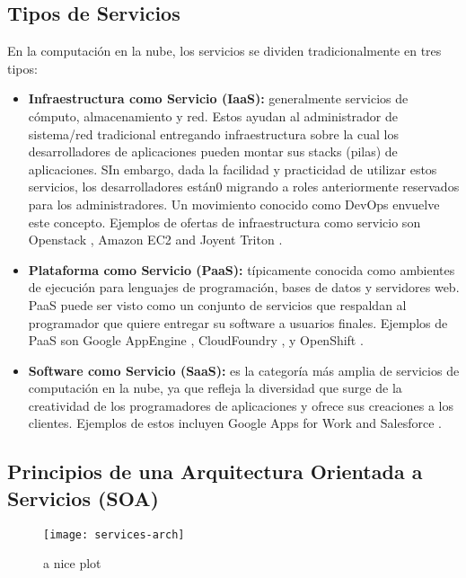         \subsection{Tipos de Servicios}
        En la computación en la nube, los servicios se dividen tradicionalmente en tres tipos:
        \begin{itemize}
            \item \textbf{Infraestructura como Servicio (IaaS):} generalmente servicios de cómputo, almacenamiento y red. Estos ayudan al administrador de sistema/red tradicional entregando infraestructura sobre la cual los desarrolladores de aplicaciones pueden montar sus stacks (pilas) de aplicaciones. SIn embargo, dada la facilidad y practicidad de utilizar estos servicios, los desarrolladores están0 migrando a roles anteriormente reservados para los administradores. Un movimiento conocido como DevOps envuelve este concepto. Ejemplos de ofertas de infraestructura como servicio son Openstack \citeyear{Openstack2016-od}, Amazon EC2 \citeyear{Aws2016-fc} and Joyent Triton \citeyear{Joyent2016-wr}.
            \item \textbf{Plataforma como Servicio (PaaS): }típicamente conocida como ambientes de ejecución para lenguajes de programación, bases de datos y servidores web. PaaS puede ser visto como un conjunto de servicios que respaldan al programador que quiere entregar su software a usuarios finales. Ejemplos de PaaS son Google AppEngine \citeyear{Google2016-zb}, CloudFoundry \citeyear{Cloudfoundry2016-vz}, y OpenShift \citeyear{RedHat2016-sb}.
            \item \textbf{Software como Servicio (SaaS):} es la categoría más amplia de servicios de computación en la nube, ya que refleja la diversidad que surge de la creatividad de los programadores de aplicaciones y ofrece sus creaciones a los clientes. Ejemplos de estos incluyen Google Apps for Work\citeyear{Google2016-ts} and Salesforce \citeyear{Salesforce2016-mo}.
        \end{itemize}

        \subsection{Principios de una Arquitectura Orientada a Servicios (SOA)}
        
    \begin{figure}[H]
        \centering
        \texttt{[image: services-arch]}
        \caption{a nice plot \protect\cite{Fox2013-ct}}
        \label{fig:services-arch}
    \end{figure}
        
